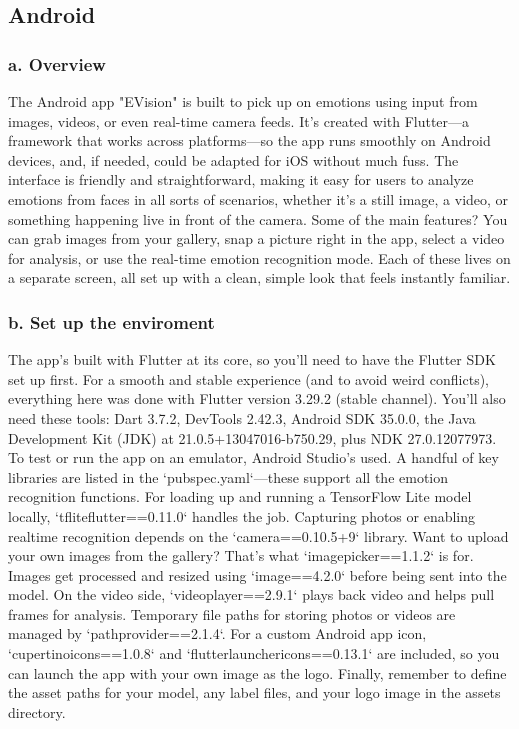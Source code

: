 \documentclass[a4paper,13pt]{report}
\begin{document}
\subsection{Android}
\subsubsection{a. Overview}
The Android app "EVision" is built to pick up on emotions using input from images, videos, or even real-time camera feeds. It’s created with Flutter—a framework that works across platforms—so the app runs smoothly on Android devices, and, if needed, could be adapted for iOS without much fuss. The interface is friendly and straightforward, making it easy for users to analyze emotions from faces in all sorts of scenarios, whether it’s a still image, a video, or something happening live in front of the camera. Some of the main features? You can grab images from your gallery, snap a picture right in the app, select a video for analysis, or use the real-time emotion recognition mode. Each of these lives on a separate screen, all set up with a clean, simple look that feels instantly familiar.

\subsubsection{b. Set up the enviroment }
The app’s built with Flutter at its core, so you’ll need to have the Flutter SDK set up first. For a smooth and stable experience (and to avoid weird conflicts), everything here was done with Flutter version 3.29.2 (stable channel). You’ll also need these tools: Dart 3.7.2, DevTools 2.42.3, Android SDK 35.0.0, the Java Development Kit (JDK) at 21.0.5+13047016-b750.29, plus NDK 27.0.12077973. To test or run the app on an emulator, Android Studio’s used. A handful of key libraries are listed in the `pubspec.yaml`—these support all the emotion recognition functions. For loading up and running a TensorFlow Lite model locally, `tflite\textunderscore flutter==0.11.0` handles the job. Capturing photos or enabling realtime recognition depends on the `camera==0.10.5+9` library. Want to upload your own images from the gallery? That’s what `image\textunderscore picker==1.1.2` is for. Images get processed and resized using `image==4.2.0` before being sent into the model. On the video side, `video\textunderscore player==2.9.1` plays back video and helps pull frames for analysis. Temporary file paths for storing photos or videos are managed by `path\textunderscore provider==2.1.4`. For a custom Android app icon, `cupertino\textunderscore icons==1.0.8` and `flutter\textunderscore launcher\textunderscore icons==0.13.1` are included, so you can launch the app with your own image as the logo. Finally, remember to define the asset paths for your model, any label files, and your logo image in the assets directory.
\end{document}
